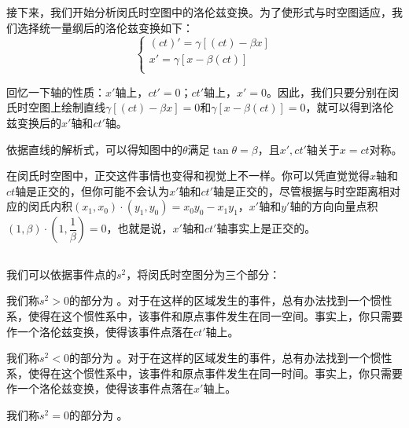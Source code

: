 接下来，我们开始分析闵氏时空图中的洛伦兹变换。为了使形式与时空图适应，我们选择统一量纲后的洛伦兹变换如下：
\[\left\{\begin{array}{l}
	(ct)'=\gamma[(ct)-\beta x]\\
	x'=\gamma[x-\beta(ct)]\\
\end{array}\right.\]

回忆一下轴的性质：$x'$轴上，$ct'=0$；$ct'$轴上，$x'=0$。因此，我们只要分别在闵氏时空图上绘制直线$\gamma[(ct)-\beta x]=0$和$ \gamma[x-\beta(ct)]=0$，就可以得到洛伦兹变换后的$x'$轴和$ct'$轴。

依据直线的解析式，可以得知图中的$\theta$满足$\tan\theta = \beta$，且$x',ct'$轴关于$x=ct$对称。

在闵氏时空图中，正交这件事情也变得和视觉上不一样。你可以凭直觉觉得$x$轴和$ct$轴是正交的，但你可能不会认为$x'$轴和$ct'$轴是正交的，尽管根据与时空距离相对应的闵氏内积$(x_1,x_0)\cdot(y_1,y_0)=x_0y_0-x_1y_1$，$x'$轴和$y'$轴的方向向量点积$(1,\beta)\cdot(1,\dfrac{1}{\beta})=0$，也就是说，$x'$轴和$ct'$轴事实上是正交的。

\subsection[时序和因果关系]{}
我们可以依据事件点的$s^2$，将闵氏时空图分为三个部分：
\begin{Itemize}
	\item {} 我们称$s^2>0$的部分为 。对于在这样的区域发生的事件，总有办法找到一个惯性系，使得在这个惯性系中，该事件和原点事件发生在同一空间。事实上，你只需要作一个洛伦兹变换，使得该事件点落在$ct'$轴上。
	\item  {} 我们称$s^2<0$的部分为 。对于在这样的区域发生的事件，总有办法找到一个惯性系，使得在这个惯性系中，该事件和原点事件发生在同一时间。事实上，你只需要作一个洛伦兹变换，使得该事件点落在$x'$轴上。
	\item {} 我们称$s^2=0$的部分为 。
\end{Itemize}

